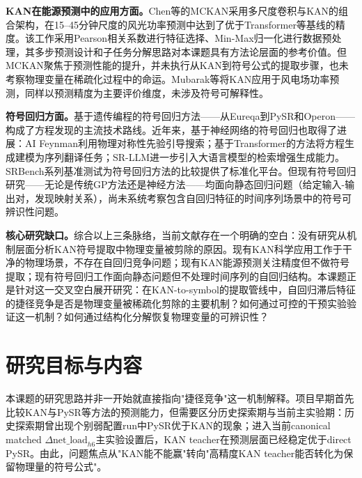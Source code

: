 \textbf{KAN在能源预测中的应用方面。}Chen等\cite{chen2025mckan}的MCKAN采用多尺度卷积与KAN的组合架构，在15--45分钟尺度的风光功率预测中达到了优于Transformer等基线的精度。该工作采用Pearson相关系数进行特征选择、Min-Max归一化进行数据预处理，其多步预测设计和子任务分解思路对本课题具有方法论层面的参考价值。但MCKAN聚焦于预测性能的提升，并未执行从KAN到符号公式的提取步骤，也未考察物理变量在稀疏化过程中的命运。Mubarak等\cite{mubarak2024kan}将KAN应用于风电场功率预测，同样以预测精度为主要评价维度，未涉及符号可解释性。

\textbf{符号回归方面。}基于遗传编程的符号回归方法——从Eureqa\cite{schmidt2009distilling}到PySR\cite{cranmer2023pysr}和Operon\cite{burlacu2020operon}——构成了方程发现的主流技术路线。近年来，基于神经网络的符号回归也取得了进展：AI Feynman\cite{udrescu2020ai}利用物理对称性先验引导搜索；基于Transformer的方法\cite{biggio2021neural,kamienny2022end}将方程生成建模为序列翻译任务；SR-LLM\cite{shojaee2025sr}进一步引入大语言模型的检索增强生成能力。SRBench系列基准测试\cite{lacava2021srbench,orzechowski2018where,defranca2023srbench}为符号回归方法的比较提供了标准化平台。但现有符号回归研究——无论是传统GP方法还是神经方法——均面向静态回归问题（给定输入-输出对，发现映射关系），尚未系统考察包含自回归特征的时间序列场景中的符号可辨识性问题。

\textbf{核心研究缺口。}综合以上三条脉络，当前文献存在一个明确的空白：没有研究从机制层面分析KAN符号提取中物理变量被剪除的原因。现有KAN科学应用\cite{liu2025kan,liu2025kan2,panczyk2024kan}工作于干净的物理场景，不存在自回归竞争问题；现有KAN能源预测\cite{chen2025mckan,mubarak2024kan}关注精度但不做符号提取；现有符号回归工作\cite{schmidt2009distilling,cranmer2023pysr,udrescu2020ai,shojaee2025sr}面向静态问题但不处理时间序列的自回归结构。本课题正是针对这一交叉空白展开研究：在KAN-to-symbol的提取管线中，自回归滞后特征的捷径竞争是否是物理变量被稀疏化剪除的主要机制？如何通过可控的干预实验验证这一机制？如何通过结构化分解恢复物理变量的可辨识性？

\section{研究目标与内容}

本课题的研究思路并非一开始就直接指向"捷径竞争"这一机制解释。项目早期首先比较KAN与PySR等方法的预测能力，但需要区分历史探索期与当前主实验期：历史探索期曾出现个别弱配置run中PySR优于KAN的现象；进入当前canonical matched $\Delta\text{net\_load}_{h6}$主实验设置后，KAN teacher在预测层面已经稳定优于direct PySR。由此，问题焦点从"KAN能不能赢"转向"高精度KAN teacher能否转化为保留物理量的符号公式"。

